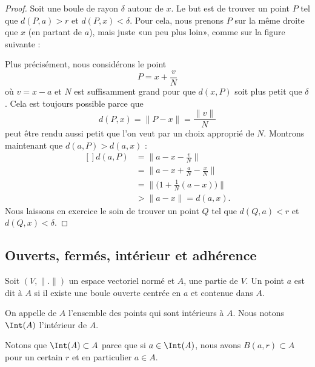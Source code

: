 \begin{proof}
	Soit une boule de rayon \( \delta\) autour de \( x\). Le but est de trouver un point \( P\) tel que \( d(P,a)>r\) et \( d(P,x)<\delta\). Pour cela, nous prenons \( P\) sur la même droite que \( x\) (en partant de \( a\)), mais juste «un peu plus loin», comme sur la figure suivante :

	\begin{center}
		
	\end{center}

	Plus précisément, nous considérons le point
	\begin{equation}
		P=x+\frac{ v }{ N }
	\end{equation}
	où \( v=x-a\) et \( N\) est suffisamment grand pour que \( d(x,P)\) soit plus petit que \( \delta\). Cela est toujours possible parce que
	\begin{equation}
		d(P,x)=\| P-x \|=\frac{ \| v \| }{ N }
	\end{equation}
	peut être rendu aussi petit que l'on veut par un choix approprié de \( N\). Montrons maintenant que \( d(a,P)>d(a,x)\) :
	\begin{equation}
		\begin{aligned}[]
			d(a,P) & =\| a-x-\frac{ v }{ N }\|                  \\
			       & =\| a-x+\frac{ a }{ N }-\frac{ x }{ N } \| \\
			       & =\| \big( 1+\frac{1}{ N }(a-x) \big) \|    \\
			       & >\| a-x \|=d(a,x).
		\end{aligned}
	\end{equation}
	Nous laissons en exercice le soin de trouver un point \( Q\) tel que \( d(Q,a)<r\) et \( d(Q,x)<\delta\).
\end{proof}


\subsection{Ouverts, fermés, intérieur et adhérence}

\begin{definition}
	Soit \( (V,\| . \|)\) un espace vectoriel normé et \( A\), une partie de \( V\). Un point \( a\) est dit  à \( A\) si il existe une boule ouverte centrée en \( a\) et contenue dans \( A\).

	On appelle  de \( A\) l'ensemble des points qui sont intérieurs à \( A\). Nous notons \( \Int(A)\) l'intérieur de \( A\).
\end{definition}
Notons que \( \Int(A)\subset A\) parce que si \( a\in\Int(A)\), nous avons \( B(a,r)\subset A\) pour un certain \( r\) et en particulier \( a\in A\).

